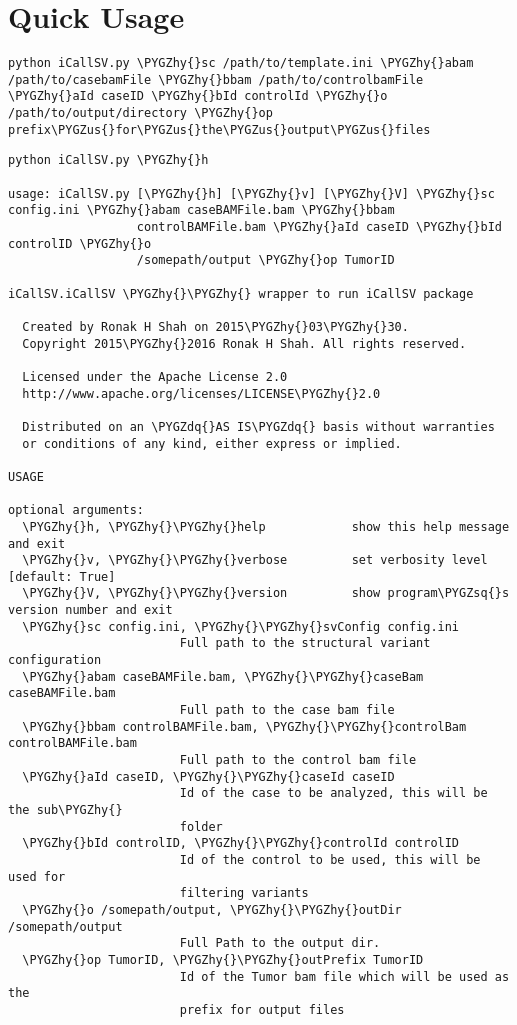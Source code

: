 \documentclass[letterpaper,10pt,english]{sphinxmanual}
\def\PYGZus{\char`\_}
\def\PYGZhy{\char`\-}
\def\PYGZsq{\char`\'}
\def\PYGZdq{\char`\"}
\renewcommand\PYGZsq{\textquotesingle}
\begin{document}
\section{Quick Usage}
\label{iCallSV:quick-usage}
\begin{Verbatim}[commandchars=\\\{\}]
python iCallSV.py \PYGZhy{}sc /path/to/template.ini \PYGZhy{}abam /path/to/casebamFile \PYGZhy{}bbam /path/to/controlbamFile \PYGZhy{}aId caseID \PYGZhy{}bId controlId \PYGZhy{}o /path/to/output/directory \PYGZhy{}op prefix\PYGZus{}for\PYGZus{}the\PYGZus{}output\PYGZus{}files
\end{Verbatim}

\begin{Verbatim}[commandchars=\\\{\}]
python iCallSV.py \PYGZhy{}h

usage: iCallSV.py [\PYGZhy{}h] [\PYGZhy{}v] [\PYGZhy{}V] \PYGZhy{}sc config.ini \PYGZhy{}abam caseBAMFile.bam \PYGZhy{}bbam
                  controlBAMFile.bam \PYGZhy{}aId caseID \PYGZhy{}bId controlID \PYGZhy{}o
                  /somepath/output \PYGZhy{}op TumorID

iCallSV.iCallSV \PYGZhy{}\PYGZhy{} wrapper to run iCallSV package

  Created by Ronak H Shah on 2015\PYGZhy{}03\PYGZhy{}30.
  Copyright 2015\PYGZhy{}2016 Ronak H Shah. All rights reserved.

  Licensed under the Apache License 2.0
  http://www.apache.org/licenses/LICENSE\PYGZhy{}2.0

  Distributed on an \PYGZdq{}AS IS\PYGZdq{} basis without warranties
  or conditions of any kind, either express or implied.

USAGE

optional arguments:
  \PYGZhy{}h, \PYGZhy{}\PYGZhy{}help            show this help message and exit
  \PYGZhy{}v, \PYGZhy{}\PYGZhy{}verbose         set verbosity level [default: True]
  \PYGZhy{}V, \PYGZhy{}\PYGZhy{}version         show program\PYGZsq{}s version number and exit
  \PYGZhy{}sc config.ini, \PYGZhy{}\PYGZhy{}svConfig config.ini
                        Full path to the structural variant configuration
  \PYGZhy{}abam caseBAMFile.bam, \PYGZhy{}\PYGZhy{}caseBam caseBAMFile.bam
                        Full path to the case bam file
  \PYGZhy{}bbam controlBAMFile.bam, \PYGZhy{}\PYGZhy{}controlBam controlBAMFile.bam
                        Full path to the control bam file
  \PYGZhy{}aId caseID, \PYGZhy{}\PYGZhy{}caseId caseID
                        Id of the case to be analyzed, this will be the sub\PYGZhy{}
                        folder
  \PYGZhy{}bId controlID, \PYGZhy{}\PYGZhy{}controlId controlID
                        Id of the control to be used, this will be used for
                        filtering variants
  \PYGZhy{}o /somepath/output, \PYGZhy{}\PYGZhy{}outDir /somepath/output
                        Full Path to the output dir.
  \PYGZhy{}op TumorID, \PYGZhy{}\PYGZhy{}outPrefix TumorID
                        Id of the Tumor bam file which will be used as the
                        prefix for output files
\end{Verbatim}
\end{document}
